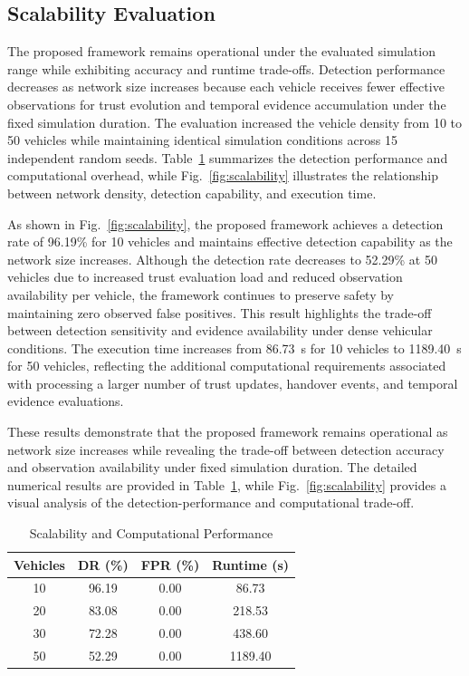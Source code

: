 \documentclass[journal]{IEEEtran}
\begin{document}
\subsection{Scalability Evaluation}
\label{subsec:scalability}

The proposed framework remains operational under the evaluated simulation
range while exhibiting accuracy and runtime trade-offs.
Detection performance decreases as network size increases because
each vehicle receives fewer effective observations for trust evolution
and temporal evidence accumulation under the fixed simulation duration.
The evaluation increased
the vehicle density from 10 to 50 vehicles while maintaining identical
simulation conditions across 15 independent random seeds.
Table~\ref{tab:scalability} summarizes the detection performance and
computational overhead, while Fig.~\ref{fig:scalability} illustrates
the relationship between network density, detection capability, and execution
time.

As shown in Fig.~\ref{fig:scalability}, the proposed framework
achieves a detection rate of 96.19\% for 10 vehicles and maintains effective
detection capability as the network size increases. Although the detection
rate decreases to 52.29\% at 50 vehicles due to increased trust evaluation
load and reduced observation availability per vehicle, the framework
continues to preserve safety by maintaining zero observed false positives.
This result highlights the trade-off between detection sensitivity
and evidence availability under dense vehicular conditions. The execution time increases
from 86.73~s for 10 vehicles to 1189.40~s for 50 vehicles, reflecting the
additional computational requirements associated with processing a larger
number of trust updates, handover events, and temporal evidence evaluations.

These results demonstrate that the proposed framework remains operational
as network size increases while revealing the trade-off between detection
accuracy and observation availability under fixed simulation duration. The
detailed numerical results are provided in Table~\ref{tab:scalability}, while
Fig.~\ref{fig:scalability} provides a visual analysis of the
detection-performance and computational trade-off.

\begin{table}[!t]
\caption{Scalability and Computational Performance}
\label{tab:scalability}
\centering
\begin{tabular}{cccc}
\toprule
\textbf{Vehicles} & \textbf{DR (\%)} & \textbf{FPR (\%)} & \textbf{Runtime (s)} \\
\midrule
10 & 96.19 & 0.00 & 86.73 \\
20 & 83.08 & 0.00 & 218.53 \\
30 & 72.28 & 0.00 & 438.60 \\
50 & 52.29 & 0.00 & 1189.40 \\
\bottomrule
\end{tabular}
\end{table}
\end{document}

